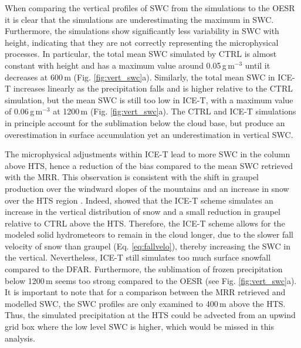 \documentclass{ametsocV5}
\begin{document}
        When comparing the vertical profiles of SWC from the simulations to the OESR it is clear that the simulations are underestimating the maximum in SWC. Furthermore, the simulations show significantly less variability in SWC with height, indicating that they are not correctly representing the microphysical processes. In particular, the total mean SWC simulated by CTRL is almost constant with height and has a maximum value around 0.05\,g\,m$^{-3}$ until it decreases at 600\,m (Fig. \ref{fig:vert_swc}a). Similarly, the total mean SWC in ICE-T increases linearly as the precipitation falls and is higher relative to the CTRL simulation, but the mean SWC is still too low in ICE-T, with a maximum value of 0.06\,g\,m$^{-3}$ at 1200\,m (Fig. \ref{fig:vert_swc}a). The CTRL and ICE-T simulations in principle account for the sublimation below the cloud base, but produce an overestimation in surface accumulation yet an underestimation in vertical SWC. 
        
        The microphysical adjustments within ICE-T lead to more SWC in the column above HTS, hence a reduction of the bias compared to the mean SWC retrieved with the MRR. This observation is consistent with the shift in graupel production over the windward slopes of the mountains and an increase in snow over the HTS region \citep{engdahl_effects_2020}. Indeed, \citet{engdahl_effects_2020} showed that the ICE-T scheme simulates an increase in the vertical distribution of snow and a small reduction in graupel relative to CTRL above the HTS. Therefore, the ICE-T scheme allows for the modeled solid hydrometeors to remain in the cloud longer, due to the slower fall velocity of snow than graupel (Eq. \ref{eq:fallvelo}), thereby increasing the SWC in the vertical. Nevertheless, ICE-T still simulates too much surface snowfall compared to the DFAR. Furthermore, the sublimation of frozen precipitation below 1200\,m seems too strong compared to the OESR (see Fig. \ref{fig:vert_swc}a). It is important to note that for a comparison between the MRR retrieved and modelled SWC, the SWC profiles are only examined to 400\,m above the HTS. Thus, the simulated precipitation at the HTS could be advected from an upwind grid box where the low level SWC is higher, which would be missed in this analysis.
        
\end{document}
